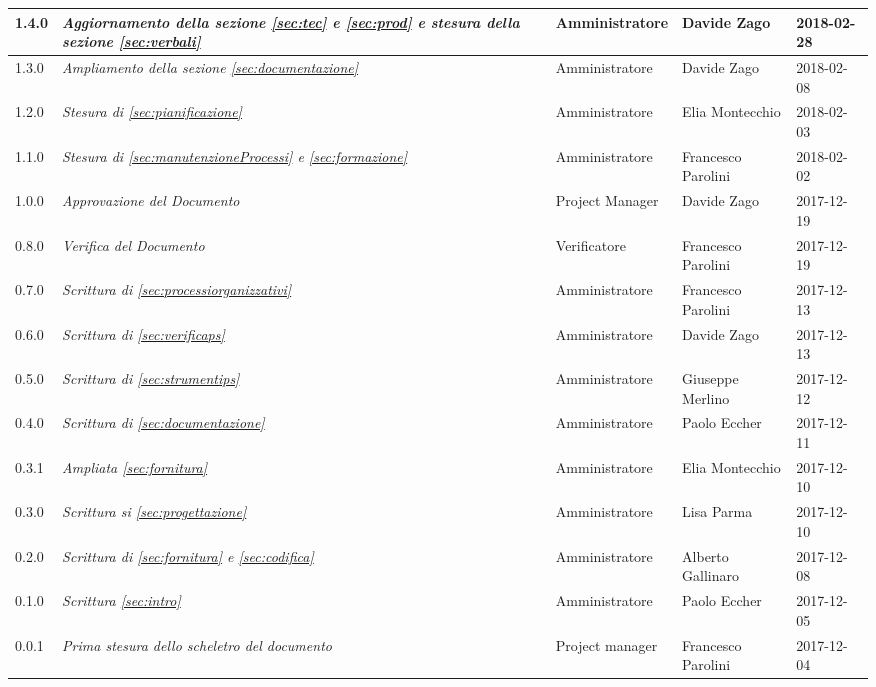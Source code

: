 \begin{longtable}[H]{C{2cm}|C{4cm}|C{3cm}|C{3cm}|R{2cm}}
		1.4.0  & \emph{Aggiornamento della sezione \ref{sec:tec} e \ref{sec:prod} e stesura della sezione \ref{sec:verbali}} &  Amministratore & Davide Zago & 2018-02-28  \\
		\hline
		
		1.3.0  & \emph{Ampliamento della sezione \ref{sec:documentazione}} &  Amministratore & Davide Zago & 2018-02-08  \\
		\hline
		
		1.2.0  & \emph{Stesura di \ref{sec:pianificazione}} &  Amministratore & Elia Montecchio & 2018-02-03  \\
		\hline
		
		1.1.0  & \emph{Stesura di \ref{sec:manutenzioneProcessi} e \ref{sec:formazione}} &  Amministratore & Francesco Parolini & 2018-02-02  \\
		\hline
		
		1.0.0  & \emph{Approvazione del Documento} & Project Manager & Davide Zago &  2017-12-19 \\
		\hline
		
		0.8.0  &  \emph{Verifica del Documento} & Verificatore & Francesco Parolini & 2017-12-19 \\
		\hline
		
		0.7.0  & \emph{Scrittura di \ref{sec:processiorganizzativi}}  & Amministratore & Francesco Parolini & 2017-12-13\\
		\hline
		
		0.6.0  & \emph{Scrittura di \ref{sec:verificaps}} &  Amministratore & Davide Zago  & 2017-12-13 \\
		\hline
		
		0.5.0  & \emph{Scrittura di \ref{sec:strumentips}} & Amministratore & Giuseppe Merlino & 2017-12-12\\
		\hline
		
		0.4.0  &\emph{Scrittura di \ref{sec:documentazione}}& Amministratore & Paolo Eccher  & 2017-12-11 \\
		\hline
		
		0.3.1 & \emph{Ampliata \ref{sec:fornitura}}& Amministratore & Elia Montecchio & 2017-12-10 \\
		\hline
		
		0.3.0 & \emph{Scrittura si \ref{sec:progettazione}} & Amministratore & Lisa Parma & 2017-12-10 \\
		\hline
		
		0.2.0 & \emph{Scrittura di \ref{sec:fornitura} e \ref{sec:codifica}} & Amministratore & Alberto Gallinaro & 2017-12-08 \\
		\hline
		
		0.1.0 & \emph{Scrittura \ref{sec:intro}} & Amministratore & Paolo Eccher & 2017-12-05 \\
		\hline
		
		0.0.1 &\emph{Prima stesura dello scheletro del documento} &  Project manager & Francesco Parolini & 2017-12-04 \\
		
	

		
	\end{longtable}


	\clearpage